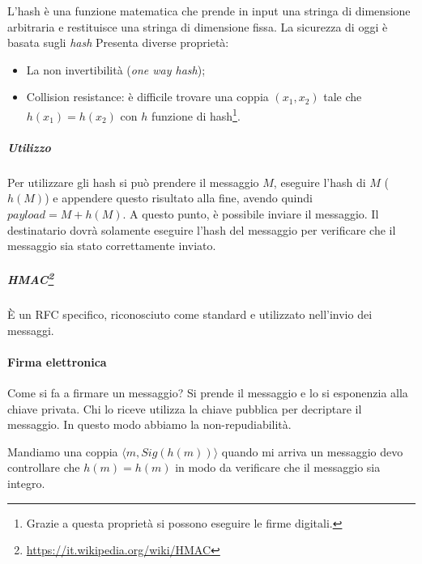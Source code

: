 L'hash è una funzione matematica che prende in input una stringa di dimensione
arbitraria e restituisce una stringa di dimensione fissa. La sicurezza di oggi è
basata sugli \textit{hash} Presenta diverse proprietà:
\begin{itemize}
\item La non invertibilità (\emph{one way hash});
\item Collision resistance: è difficile trovare una coppia $(x_1,x_2)$ tale che
$h(x_1) = h(x_2)$ con $h$ funzione di hash\footnote{Grazie a questa proprietà si
possono eseguire le firme digitali.}.
\end{itemize}

\subparagraph*{Utilizzo}

Per utilizzare gli hash si può prendere il messaggio $M$, eseguire l'hash di $M$
($h(M)$) e appendere questo risultato alla fine, avendo quindi $payload = M +
h(M)$. A questo punto, è possibile inviare il messaggio. Il destinatario dovrà
solamente eseguire l'hash del messaggio per verificare che il messaggio sia
stato correttamente inviato.

\subparagraph*{HMAC\footnote{\url{https://it.wikipedia.org/wiki/HMAC}}}

È un RFC specifico, riconosciuto come standard e utilizzato nell'invio dei
messaggi.


\paragraph{Firma elettronica}

Come si fa a firmare un messaggio? Si prende il messaggio e lo si esponenzia
alla chiave privata. Chi lo riceve utilizza la chiave pubblica per decriptare il
messaggio. In questo modo abbiamo la non-repudiabilità.

Mandiamo una coppia $ \langle m, Sig(h(m)) \rangle $ quando mi arriva un
messaggio devo controllare che
$h(m) = h(m)$ in modo da verificare che il messaggio sia integro.
